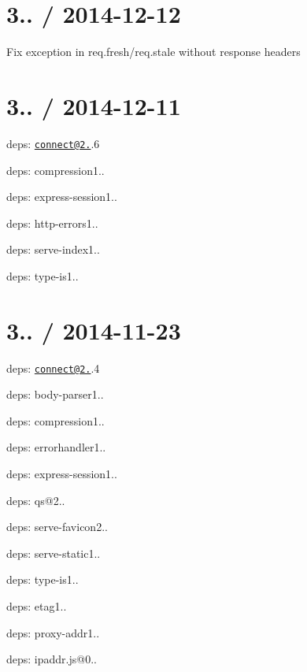 \section*{3.. / 2014-\/12-\/12 }


\begin{DoxyItemize}
\item Fix exception in {\ttfamily req.\+fresh}/{\ttfamily req.\+stale} without response headers
\end{DoxyItemize}

\section*{3.. / 2014-\/12-\/11 }


\begin{DoxyItemize}
\item deps\+: \href{mailto:connect@2.27}{\tt connect@2.}.6
\begin{DoxyItemize}
\item deps\+: compression1..
\item deps\+: express-\/session1..
\item deps\+: http-\/errors1..
\item deps\+: serve-\/index1..
\item deps\+: type-\/is1..
\end{DoxyItemize}
\end{DoxyItemize}

\section*{3.. / 2014-\/11-\/23 }


\begin{DoxyItemize}
\item deps\+: \href{mailto:connect@2.27}{\tt connect@2.}.4
\begin{DoxyItemize}
\item deps\+: body-\/parser1..
\item deps\+: compression1..
\item deps\+: errorhandler1..
\item deps\+: express-\/session1..
\item deps\+: qs@2..
\item deps\+: serve-\/favicon2..
\item deps\+: serve-\/static1..
\item deps\+: type-\/is1..
\end{DoxyItemize}
\item deps\+: etag1..
\item deps\+: proxy-\/addr1..
\begin{DoxyItemize}
\item deps\+: ipaddr.\+js@0..
\end{DoxyItemize}
\end{DoxyItemize}

